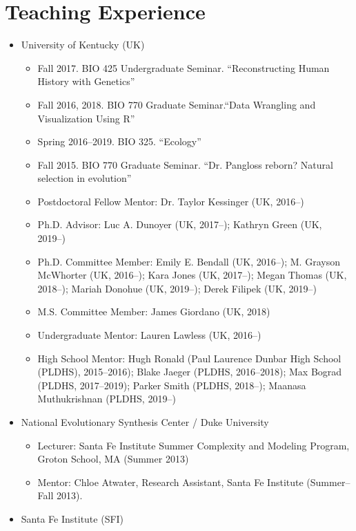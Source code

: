 \documentclass[11pt]{article}
\begin{document}
  \section{Teaching Experience}

  \begin{itemize}
  \item University of Kentucky (UK)
    \begin{itemize}
    \item Fall 2017. BIO 425 Undergraduate Seminar. ``Reconstructing Human History with Genetics''
    \item Fall 2016, 2018. BIO 770 Graduate Seminar.``Data Wrangling and Visualization Using R''
    \item Spring 2016--2019. BIO 325. ``Ecology''
    \item Fall 2015. BIO 770 Graduate Seminar. ``Dr. Pangloss reborn? Natural selection in evolution''
    \item Postdoctoral Fellow Mentor: Dr. Taylor Kessinger (UK, 2016--)
    \item Ph.D. Advisor: Luc A. Dunoyer (UK, 2017--); Kathryn Green (UK, 2019--)
    \item Ph.D. Committee Member: Emily E. Bendall (UK, 2016--); M. Grayson McWhorter (UK, 2016--); Kara Jones (UK, 2017--); Megan Thomas (UK, 2018--); Mariah Donohue (UK, 2019--); Derek Filipek (UK, 2019--)
     \item M.S. Committee Member: James Giordano (UK, 2018)
    \item Undergraduate Mentor: Lauren Lawless (UK, 2016--)
    \item High School Mentor: Hugh Ronald (Paul Laurence Dunbar High School (PLDHS), 2015--2016); Blake Jaeger (PLDHS, 2016--2018); Max Bograd (PLDHS, 2017--2019); Parker Smith (PLDHS, 2018--); Maanasa Muthukrishnan (PLDHS, 2019--)
    \end{itemize}
  \item National Evolutionary Synthesis Center / Duke University
    \begin{itemize}
    \item Lecturer: Santa Fe Institute Summer Complexity and Modeling Program, \\
      Groton School, MA (Summer 2013)
    \item Mentor: Chloe Atwater, Research Assistant, Santa Fe Institute (Summer--Fall 2013).
    \end{itemize}
  \item Santa Fe Institute (SFI)
    \begin{itemize}

\end{itemize}
\end{itemize}
\end{document}
